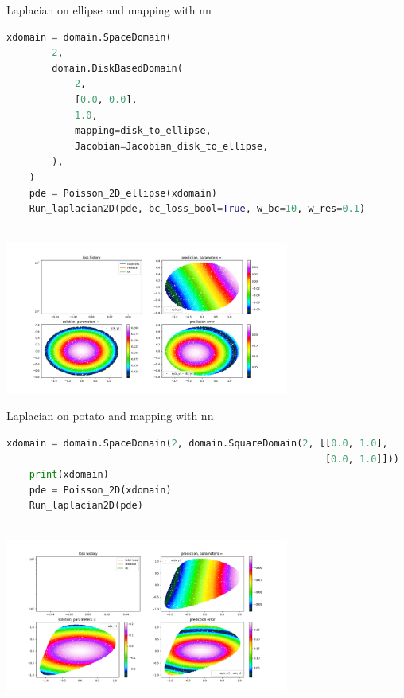 \documentclass[12pt]{article}
\begin{document}
Laplacian on ellipse and mapping with nn
\begin{lstlisting}[language=Python,caption={},frame=single, backgroundcolor=\color{gray!10}, basicstyle=\footnotesize,rulecolor=\color{blue}, framexleftmargin=3pt, commentstyle=\color{mygreen}, keywordstyle=\color{blue}]
    xdomain = domain.SpaceDomain(
        2,
        domain.DiskBasedDomain(
            2,
            [0.0, 0.0],
            1.0,
            mapping=disk_to_ellipse,
            Jacobian=Jacobian_disk_to_ellipse,
        ),
    )
    pde = Poisson_2D_ellipse(xdomain)
    Run_laplacian2D(pde, bc_loss_bool=True, w_bc=10, w_res=0.1)
    
\end{lstlisting}
\begin{frame}{}
    \begin{center}
        \includegraphics[width=0.7\textwidth]{images/scimbaplot3.png}
        \end{center}
\end{frame}
Laplacian on potato and mapping with nn
\begin{lstlisting}[language=Python,caption={},frame=single, backgroundcolor=\color{gray!10}, basicstyle=\footnotesize,rulecolor=\color{blue}, framexleftmargin=3pt, commentstyle=\color{mygreen}, keywordstyle=\color{blue}]
    xdomain = domain.SpaceDomain(2, domain.SquareDomain(2, [[0.0, 1.0], 
                                                        [0.0, 1.0]]))
    print(xdomain)
    pde = Poisson_2D(xdomain)
    Run_laplacian2D(pde)
    
\end{lstlisting}
\begin{frame}{}
    \begin{center}
        \includegraphics[width=0.7\textwidth]{images/scimbaplot4.png}

    \end{center}
\end{frame}
\end{document}
